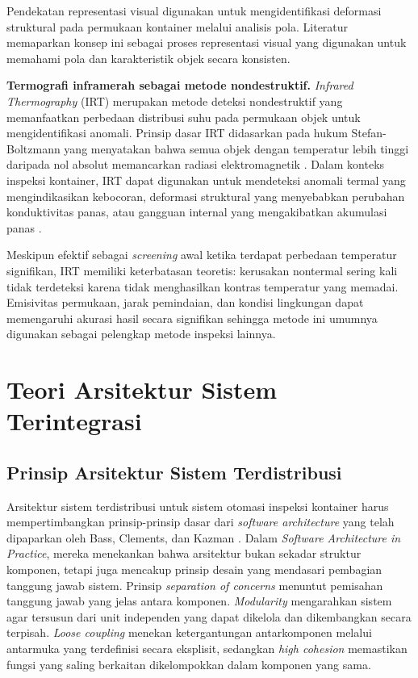 Pendekatan representasi visual digunakan untuk mengidentifikasi deformasi struktural pada permukaan kontainer melalui analisis pola. Literatur memaparkan konsep ini sebagai proses representasi visual yang digunakan untuk memahami pola dan karakteristik objek secara konsisten.

\textbf{Termografi inframerah sebagai metode nondestruktif.}
\textit{Infrared Thermography} (IRT) merupakan metode deteksi nondestruktif yang memanfaatkan perbedaan distribusi suhu pada permukaan objek untuk mengidentifikasi anomali. Prinsip dasar IRT didasarkan pada hukum Stefan-Boltzmann yang menyatakan bahwa semua objek dengan temperatur lebih tinggi daripada nol absolut memancarkan radiasi elektromagnetik \autocite{maldague2002}. Dalam konteks inspeksi kontainer, IRT dapat digunakan untuk mendeteksi anomali termal yang mengindikasikan kebocoran, deformasi struktural yang menyebabkan perubahan konduktivitas panas, atau gangguan internal yang mengakibatkan akumulasi panas \autocite{meola2004}.

Meskipun efektif sebagai \textit{screening} awal ketika terdapat perbedaan temperatur signifikan, IRT memiliki keterbatasan teoretis: kerusakan nontermal sering kali tidak terdeteksi karena tidak menghasilkan kontras temperatur yang memadai. Emisivitas permukaan, jarak pemindaian, dan kondisi lingkungan dapat memengaruhi akurasi hasil secara signifikan sehingga metode ini umumnya digunakan sebagai pelengkap metode inspeksi lainnya.

\section{Teori Arsitektur Sistem Terintegrasi}

\subsection{Prinsip Arsitektur Sistem Terdistribusi}

Arsitektur sistem terdistribusi untuk sistem otomasi inspeksi kontainer harus
mempertimbangkan prinsip-prinsip dasar dari \textit{software architecture} yang
telah dipaparkan oleh Bass, Clements, dan Kazman \autocite{bass2022}. Dalam
\textit{Software Architecture in Practice}, mereka menekankan bahwa arsitektur
bukan sekadar struktur komponen, tetapi juga mencakup prinsip desain yang
mendasari pembagian tanggung jawab sistem. Prinsip \textit{separation of
concerns} menuntut pemisahan tanggung jawab yang jelas antara komponen.
\textit{Modularity} mengarahkan sistem agar tersusun dari unit independen yang
dapat dikelola dan dikembangkan secara terpisah. \textit{Loose coupling}
menekan ketergantungan antarkomponen melalui antarmuka yang terdefinisi secara
eksplisit, sedangkan \textit{high cohesion} memastikan fungsi yang saling berkaitan
dikelompokkan dalam komponen yang sama.

